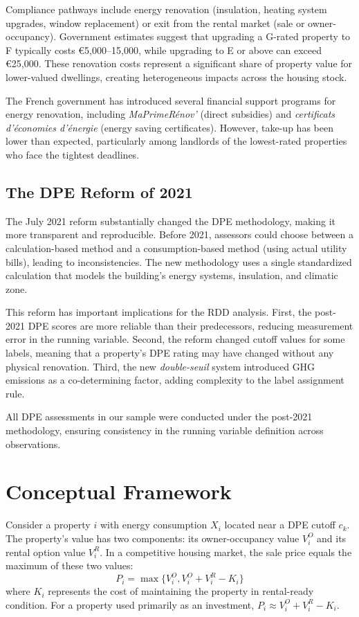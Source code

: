\documentclass[12pt]{article}
\begin{document}
Compliance pathways include energy renovation (insulation, heating system upgrades, window replacement) or exit from the rental market (sale or owner-occupancy). Government estimates suggest that upgrading a G-rated property to F typically costs \euro 5,000--15,000, while upgrading to E or above can exceed \euro 25,000. These renovation costs represent a significant share of property value for lower-valued dwellings, creating heterogeneous impacts across the housing stock.

The French government has introduced several financial support programs for energy renovation, including \textit{MaPrimeR\'enov'} (direct subsidies) and \textit{certificats d'\'economies d'\'energie} (energy saving certificates). However, take-up has been lower than expected, particularly among landlords of the lowest-rated properties who face the tightest deadlines.

\subsection{The DPE Reform of 2021}

The July 2021 reform substantially changed the DPE methodology, making it more transparent and reproducible. Before 2021, assessors could choose between a calculation-based method and a consumption-based method (using actual utility bills), leading to inconsistencies. The new methodology uses a single standardized calculation that models the building's energy systems, insulation, and climatic zone.

This reform has important implications for the RDD analysis. First, the post-2021 DPE scores are more reliable than their predecessors, reducing measurement error in the running variable. Second, the reform changed cutoff values for some labels, meaning that a property's DPE rating may have changed without any physical renovation. Third, the new \textit{double-seuil} system introduced GHG emissions as a co-determining factor, adding complexity to the label assignment rule.

All DPE assessments in our sample were conducted under the post-2021 methodology, ensuring consistency in the running variable definition across observations.


\section{Conceptual Framework}

Consider a property $i$ with energy consumption $X_i$ located near a DPE cutoff $c_k$. The property's value has two components: its owner-occupancy value $V^O_i$ and its rental option value $V^R_i$. In a competitive housing market, the sale price equals the maximum of these two values:
\begin{equation}
    P_i = \max\{V^O_i, V^O_i + V^R_i - K_i\}
\end{equation}
where $K_i$ represents the cost of maintaining the property in rental-ready condition. For a property used primarily as an investment, $P_i \approx V^O_i + V^R_i - K_i$.
\end{document}
